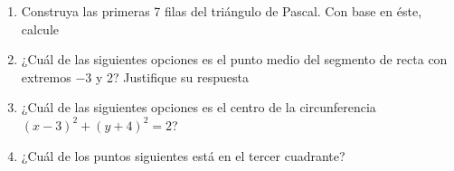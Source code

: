 \documentclass[fleqn]{article}
\begin{document}
\begin{enumerate}
\begin{enumerate}
 \end{enumerate}
 \item Construya las primeras 7 filas del triángulo de Pascal. Con base en éste, calcule \noanswer
 \begin{enumerate}
 \end{enumerate}
 \item ¿Cuál de las siguientes opciones es el punto medio del segmento de recta con extremos $-3$ y 2? Justifique su respuesta
 \begin{enumerate}
 \end{enumerate}
 \item ¿Cuál de las siguientes opciones es el centro de la circunferencia $(x - 3)^{2}+ (y+4)^{2}=2$?
 \begin{enumerate}
 \end{enumerate}
 \item ¿Cuál de los puntos siguientes está en el tercer cuadrante?
 \begin{enumerate}
 \end{enumerate}

\end{enumerate}
\end{document}
